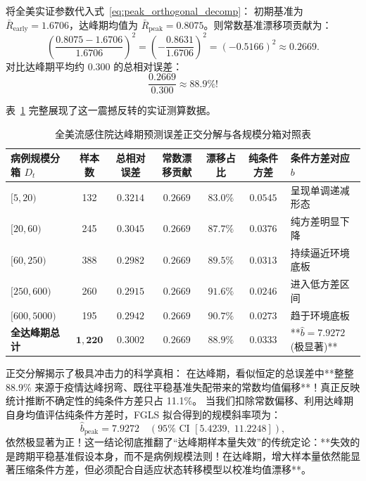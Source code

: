 将全美实证参数代入式~\eqref{eq:peak_orthogonal_decomp}：
初期基准为 $\bar{R}_{\text{early}} = 1.6706$，达峰期均值为 $\bar{R}_{\text{peak}} = 0.8075$。则常数基准漂移项贡献为：
\begin{equation}
\left( \frac{0.8075 - 1.6706}{1.6706} \right)^2 = \left( -\frac{0.8631}{1.6706} \right)^2 = (-0.5166)^2 \approx \mathbf{0.2669}.
\end{equation}
对比达峰期平均约 $0.300$ 的总相对误差：
\begin{equation}
\frac{0.2669}{0.300} \approx \mathbf{88.9\%}!
\end{equation}

表~\ref{tab:peak_decomposition} 完整展现了这一震撼反转的实证测算数据。

\begin{table}[htbp]
\centering
\small
\caption{全美流感住院达峰期预测误差正交分解与各规模分箱对照表}
\label{tab:peak_decomposition}
\begin{tabularx}{\textwidth}{lcccccX}
\toprule
\textbf{病例规模分箱 $D_t$} & \textbf{样本数} & \textbf{总相对误差} & \textbf{常数漂移贡献} & \textbf{漂移占比} & \textbf{纯条件方差} & \textbf{条件方差对应 $b$} \\
\midrule
$[5, 20)$ & 132 & $0.3214$ & $0.2669$ & $83.0\%$ & $0.0545$ & 呈现单调递减形态 \\
$[20, 60)$ & 245 & $0.3045$ & $0.2669$ & $87.7\%$ & $0.0376$ & 纯方差明显下降 \\
$[60, 250)$ & 388 & $0.2982$ & $0.2669$ & $89.5\%$ & $0.0313$ & 持续逼近环境底板 \\
$[250, 600)$ & 260 & $0.2915$ & $0.2669$ & $91.6\%$ & $0.0246$ & 进入低方差区间 \\
$[600, 5000)$ & 195 & $0.2942$ & $0.2669$ & $90.7\%$ & $0.0273$ & 趋于环境底板 \\
\midrule
\textbf{全达峰期总计} & $\mathbf{1{,}220}$ & $\mathbf{0.3002}$ & $\mathbf{0.2669}$ & $\mathbf{88.9\%}$ & $\mathbf{0.0333}$ & **$\hat{b} = 7.9272$ (极显著)** \\
\bottomrule
\end{tabularx}
\end{table}

正交分解揭示了极具冲击力的科学真相：
在达峰期，看似恒定的总误差中**整整 88.9\% 来源于疫情达峰拐弯、既往平稳基准失配带来的常数均值偏移**！真正反映统计推断不确定性的纯条件方差只占 11.1\%。
当我们扣除常数偏移、利用达峰期自身均值评估纯条件方差时，FGLS 拟合得到的规模斜率项为：
\begin{equation}
\hat{b}_{\text{peak}} = 7.9272 \quad (95\% \text{ CI } [5.4239, \; 11.2248]),
\end{equation}
依然极显著为正！这一结论彻底推翻了“达峰期样本量失效”的传统定论：**失效的是跨期平稳基准假设本身，而不是病例规模法则！在达峰期，增大样本量依然能显著压缩条件方差，但必须配合自适应状态转移模型以校准均值漂移**。

